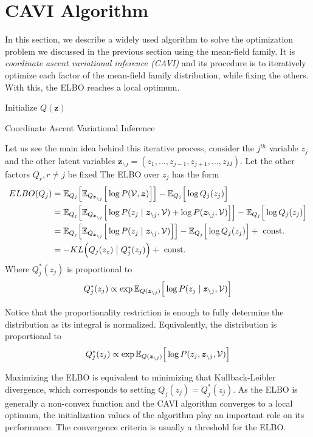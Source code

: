 \section{CAVI Algorithm }

In this section, we describe a widely used algorithm to solve the optimization problem we discussed in the previous section using the mean-field family. It is \emph{coordinate ascent variational inference (CAVI)} and its procedure is to iteratively optimize each factor of the mean-field family distribution, while fixing the others. With this, the ELBO reaches a local optimum.

 \begin{algorithm}[t]
  \SetAlgoLined
  Initialize \(Q(\bm{z})\)\;
  \;
  \caption{Coordinate Ascent Variational Inference}
  \label{alg:cavi}
\end{algorithm}

Let us see the main idea behind this iterative process, consider the \(j^{th}\) variable \(z_{j}\) and the other latent variables \(\bm{z}_{\backslash j} = (z_{1},\dots,z_{j-1},z_{j+1},\dots,z_{M})\). Let the other factors \(Q_{r}, r\neq j\) be fixed The ELBO over \(z_{j}\) has the form
\[
  \begin{aligned}
    ELBO(Q_{j}) &= \mathbb{E}_{Q_{j}}\Big[\mathbb{E}_{Q_{\bm{z}_{\backslash j}}}\Big[\log{P(\mathcal{V}, \bm{z})}\Big]\Big] - \mathbb{E}_{Q_{j}}\Big[\log{Q_{j}(z_{j})}\Big]\\
    &= \mathbb{E}_{Q_{j}}\Big[\mathbb{E}_{Q_{\bm{z}_{\backslash j}}}\Big[\log{P(z_{j} \mid \bm{z}_{\backslash j}, \mathcal{V})} + \log{P(\bm{z}_{\backslash j}, \mathcal{V})}\Big]\Big] - \mathbb{E}_{Q_{j}}\Big[\log{Q_{j}(z_{j})}\Big]\\
    &=  \mathbb{E}_{Q_{j}}\Big[\mathbb{E}_{Q_{\bm{z}_{\backslash j}}}\Big[\log{P(z_{j} \mid \bm{z}_{\backslash j}, \mathcal{V})}\Big]\Big] - \mathbb{E}_{Q_{j}}\Big[\log{Q_{j}(z_{j})}\Big] + \text{ const. }\\
    &= - KL\Big(Q_{j}(z_{z}) \bigm| Q_{j}^{*}(z_{j})\Big) + \text{ const.}
  \end{aligned}
\]
Where \(Q_{j}^{*}(z_{j}) \) is proportional to
\[
  Q_{j}^{*}(z_{j}) \propto \exp{\mathbb{E}_{Q(\bm{z}_{\backslash j})}\Big[\log{P(z_{j} \mid \bm{z}_{\backslash j}, \mathcal{V})}\Big]}
\]

Notice that the proportionality restriction is enough to fully determine the distribution as its integral is normalized. Equivalently, the distribution is proportional to
\[
    Q_{j}^{*}(z_{j}) \propto \exp{\mathbb{E}_{Q(\bm{z}_{\backslash j})}\Big[\log{P(z_{j}, \bm{z}_{\backslash j}, \mathcal{V})}\Big]}
\]

Maximizing the ELBO is equivalent to minimizing that Kullback-Leibler divergence, which corresponds to setting \(Q_{j}(z_{j}) = Q_{j}^{*}(z_{j})\).
As the ELBO is generally a non-convex function and the CAVI algorithm converges to a local optimum, the initialization values of the algorithm play an important role on its performance.
The convergence criteria is usually a threshold for the ELBO.
